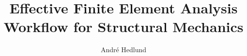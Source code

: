 \documentclass[10pt,a4paper]{report}
\author{André Hedlund}
\title{Effective Finite Element Analysis Workflow for Structural Mechanics}
\begin{document}
\maketitle
\begin{abstract}

\end{abstract}
\tableofcontents











\printbibliography


\end{document}
